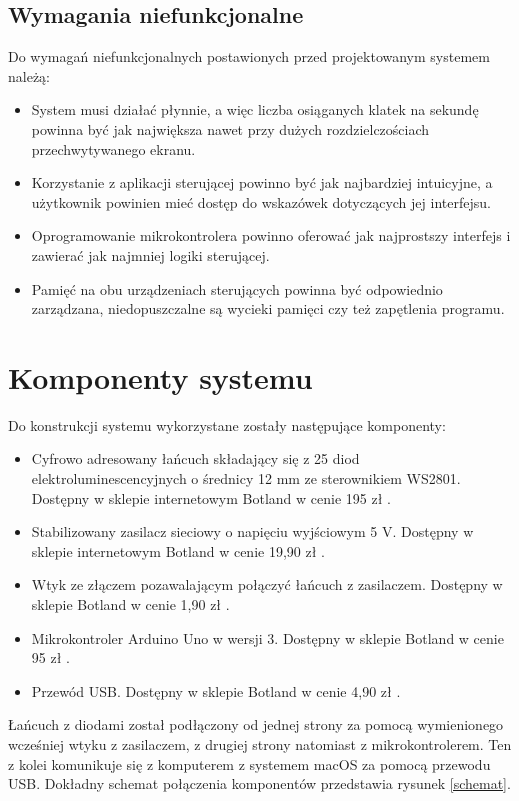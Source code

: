 \documentclass[12pt]{report}
\begin{document}
\subsection{Wymagania niefunkcjonalne}

Do wymagań niefunkcjonalnych postawionych przed projektowanym systemem należą:

\begin{itemize}
\item System musi działać płynnie, a więc liczba osiąganych klatek na sekundę powinna być jak największa nawet przy dużych rozdzielczościach przechwytywanego ekranu.
\item Korzystanie z aplikacji sterującej powinno być jak najbardziej intuicyjne, a użytkownik powinien mieć dostęp do wskazówek dotyczących jej interfejsu.
\item Oprogramowanie mikrokontrolera powinno oferować jak najprostszy interfejs i zawierać jak najmniej logiki sterującej.
\item Pamięć na obu urządzeniach sterujących powinna być odpowiednio zarządzana, niedopuszczalne są wycieki pamięci czy też zapętlenia programu.
\end{itemize}

\section{Komponenty systemu}

Do konstrukcji systemu wykorzystane zostały następujące komponenty:

\begin{itemize}
	\item Cyfrowo adresowany łańcuch składający się z 25 diod elektroluminescencyjnych o średnicy 12 mm ze sterownikiem WS2801. Dostępny w sklepie internetowym Botland w cenie 195 zł \cite{diody}.
	\item Stabilizowany zasilacz sieciowy o napięciu wyjściowym 5 V. Dostępny w sklepie internetowym Botland w cenie 19,90 zł \cite{zasilacz}.
	\item Wtyk ze złączem pozawalającym połączyć łańcuch z zasilaczem. Dostępny w sklepie Botland w cenie 1,90 zł \cite{wtyk}.
	\item Mikrokontroler Arduino Uno w wersji 3. Dostępny w sklepie Botland w cenie 95 zł \cite{arduino}.
	\item Przewód USB. Dostępny w sklepie Botland w cenie 4,90 zł \cite{usb}.
\end{itemize}

Łańcuch z diodami został podłączony od jednej strony za pomocą wymienionego wcześniej wtyku z zasilaczem, z drugiej strony natomiast z mikrokontrolerem. Ten z kolei komunikuje się z komputerem z systemem macOS za pomocą przewodu USB. Dokładny schemat połączenia komponentów przedstawia rysunek \ref{schemat}.
	
\end{document}
